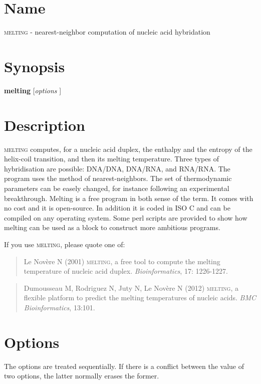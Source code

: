 \documentclass{article}
\begin{document}
 
\section{Name }
\textsc{melting} - nearest-neighbor computation of nucleic acid hybridation
\section{Synopsis}
\textbf{melting} [\textit{options }]  
\section{Description }

\textsc{melting} computes, for a nucleic acid duplex, the enthalpy and the
entropy of the helix-coil transition, and then its melting temperature. Three
types of hybridisation are possible: DNA/DNA, DNA/RNA, and RNA/RNA. The program
uses the method of nearest-neighbors. The set of thermodynamic parameters can be
easely changed, for instance following an experimental breakthrough. Melting is
a free program in both sense of the term. It comes with no cost and it is
open-source. In addition it is coded in ISO C and can be compiled on any
operating system. Some perl scripts are provided to show how melting can be used
as a block to construct more ambitious programs.

If you use \textsc{melting}, please quote one of:

\begin{quote}
  Le Nov\`ere N (2001) \textsc{melting}, a free tool to compute the
    melting temperature of nucleic acid duplex. \emph{Bioinformatics}, 17: 1226-1227. 
\end{quote}

\begin{quote}
 Dumousseau M, Rodriguez N, Juty N, Le Nov\`e{}re N (2012) \textsc{melting}, a flexible platform to predict the melting temperatures of nucleic acids. 
\emph{BMC Bioinformatics}, 13:101.
\end{quote}

\section{Options }

The options are treated sequentially. If there is a conflict between the value
of two options, the latter normally erases the former.
\end{document}
